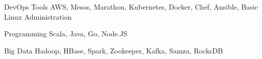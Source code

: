 

\begin{cvskills}

  \cvskill
    {DevOps Tools} %
    {AWS, Mesos, Marathon, Kubernetes, Docker, Chef, Ansible, Basic Linux Administration} %

  \cvskill
    {Programming} %
    {Scala, Java, Go, Node.JS} %

  \cvskill
    {Big Data} %
    {Hadoop, HBase, Spark, Zookeeper, Kafka, Samza, RocksDB} %

\end{cvskills}

